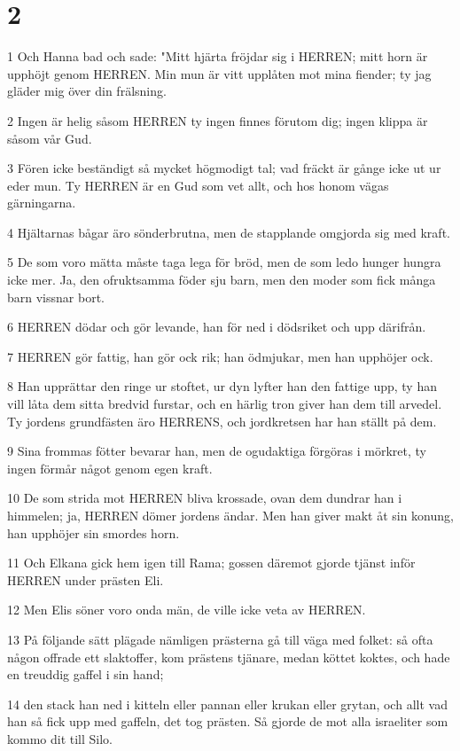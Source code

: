 \chapter{2}

\par 1 Och Hanna bad och sade: "Mitt hjärta fröjdar sig i HERREN; mitt horn är upphöjt genom HERREN. Min mun är vitt upplåten mot mina fiender; ty jag gläder mig över din frälsning.
\par 2 Ingen är helig såsom HERREN ty ingen finnes förutom dig; ingen klippa är såsom vår Gud.
\par 3 Fören icke beständigt så mycket högmodigt tal; vad fräckt är gånge icke ut ur eder mun. Ty HERREN är en Gud som vet allt, och hos honom vägas gärningarna.
\par 4 Hjältarnas bågar äro sönderbrutna, men de stapplande omgjorda sig med kraft.
\par 5 De som voro mätta måste taga lega för bröd, men de som ledo hunger hungra icke mer. Ja, den ofruktsamma föder sju barn, men den moder som fick många barn vissnar bort.
\par 6 HERREN dödar och gör levande, han för ned i dödsriket och upp därifrån.
\par 7 HERREN gör fattig, han gör ock rik; han ödmjukar, men han upphöjer ock.
\par 8 Han upprättar den ringe ur stoftet, ur dyn lyfter han den fattige upp, ty han vill låta dem sitta bredvid furstar, och en härlig tron giver han dem till arvedel. Ty jordens grundfästen äro HERRENS, och jordkretsen har han ställt på dem.
\par 9 Sina frommas fötter bevarar han, men de ogudaktiga förgöras i mörkret, ty ingen förmår något genom egen kraft.
\par 10 De som strida mot HERREN bliva krossade, ovan dem dundrar han i himmelen; ja, HERREN dömer jordens ändar. Men han giver makt åt sin konung, han upphöjer sin smordes horn.
\par 11 Och Elkana gick hem igen till Rama; gossen däremot gjorde tjänst inför HERREN under prästen Eli.
\par 12 Men Elis söner voro onda män, de ville icke veta av HERREN.
\par 13 På följande sätt plägade nämligen prästerna gå till väga med folket: så ofta någon offrade ett slaktoffer, kom prästens tjänare, medan köttet koktes, och hade en treuddig gaffel i sin hand;
\par 14 den stack han ned i kitteln eller pannan eller krukan eller grytan, och allt vad han så fick upp med gaffeln, det tog prästen. Så gjorde de mot alla israeliter som kommo dit till Silo.
